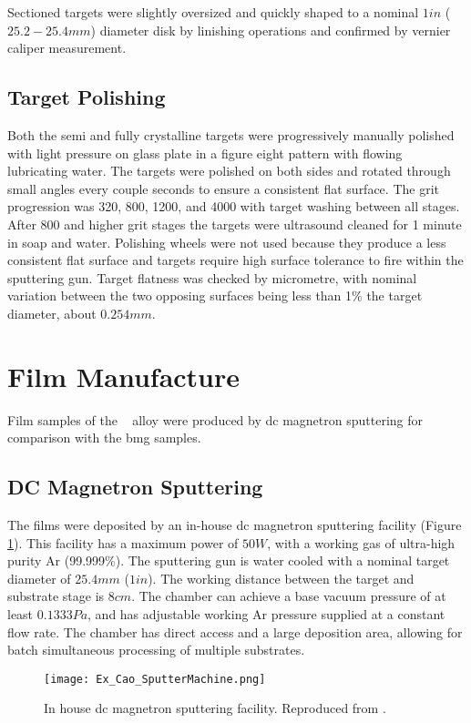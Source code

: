 Sectioned targets were slightly oversized and quickly shaped to a nominal $1 in$ ($25.2 - 25.4 mm$) diameter disk by linishing operations and confirmed by vernier caliper measurement.

\subsection{Target Polishing}
Both the semi and fully crystalline targets were progressively manually polished with light pressure on glass plate in a figure eight pattern with flowing lubricating water. The targets were polished on both sides and rotated through small angles every couple seconds to ensure a consistent flat surface. The grit progression was 320, 800, 1200, and 4000 with target washing between all stages. After 800 and higher grit stages the targets were ultrasound cleaned for 1 minute in soap and water. Polishing wheels were not used because they produce a less consistent flat surface and targets require high surface tolerance to fire within the sputtering gun. Target flatness was checked by micrometre, with nominal variation between the two opposing surfaces being less than 1\% the target diameter, about $0.254 mm$. 

\section{Film Manufacture}
Film samples of the \MgZnCa~ alloy were produced by \gls{dc} magnetron sputtering for comparison with the \gls{bmg} samples. 

\subsection{DC Magnetron Sputtering}
The films were deposited by an in-house \acrshort{dc} magnetron sputtering facility (Figure \ref{fig:CaoSputtering}). This facility has a maximum power of $50 W$, with a working gas of ultra-high purity Ar (99.999\%). The sputtering gun is water cooled with a nominal target diameter of $25.4 mm$ ($1 in$). The working distance between the target and substrate stage is $8 cm$. The chamber can achieve a base vacuum pressure of at least $0.1333 Pa$, and has adjustable working Ar pressure supplied at a constant flow rate. The chamber has direct access and a large deposition area, allowing for batch simultaneous processing of multiple substrates.

\begin{figure}[htbp]
	\centering
	\texttt{[image: Ex\_Cao\_SputterMachine.png]}
	\caption[In-house ad hoc \acrshort{dc} magnetron sputtering facility.]{In house \acrshort{dc} magnetron sputtering facility. Reproduced from \cite{Cao2013}.}
	\label{fig:CaoSputtering}
\end{figure}


